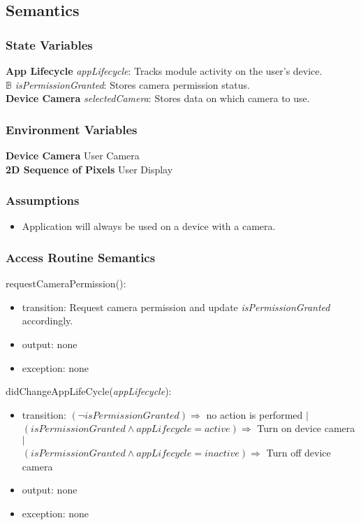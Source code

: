 \documentclass[12pt, titlepage]{article}
\begin{document}
\subsection{Semantics}

\subsubsection{State Variables}

\textbf{App Lifecycle} \textit{appLifecycle}: Tracks module activity on the user's device. \\
\textbf{$\mathbb{B}$} \textit{isPermissionGranted}: Stores camera permission status. \\
\textbf{Device Camera} \textit{selectedCamera}: Stores data on which camera to use.

\subsubsection{Environment Variables}

\textbf{Device Camera} User Camera \\
\textbf{2D Sequence of Pixels} User Display

\subsubsection{Assumptions}

\begin{itemize}
  \item Application will always be used on a device with a camera.
\end{itemize}

\subsubsection{Access Routine Semantics}

\noindent requestCameraPermission():
\begin{itemize}
  \item transition: Request camera permission and update \textit{isPermissionGranted} accordingly.
  \item output: none
  \item exception: none
  \end{itemize}

\noindent didChangeAppLifeCycle(\textit{appLifecycle}):
\begin{itemize}
  \item transition: $(\neg isPermissionGranted) \Rightarrow$ no action is performed $|$\\
                    $(isPermissionGranted \land appLifecycle = active) \Rightarrow$ Turn on device camera $|$\\
                    $(isPermissionGranted \land appLifecycle = inactive) \Rightarrow$ Turn off device camera
  \item output: none
  \item exception: none
\end{itemize}
\end{document}
